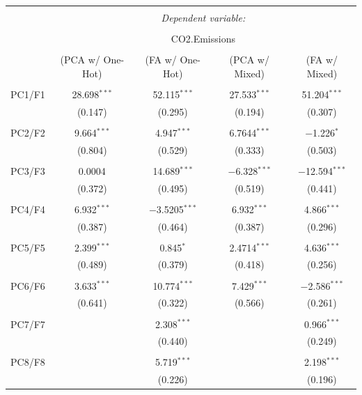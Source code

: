 \documentclass[11pt]{article}
\begin{document}
\begin{table}[!htbp] \centering \small
\begin{tabular}{@{\extracolsep{5pt}}lcccc} 
\\[-1.8ex]\hline 
\hline \\[-1.8ex] 
& \multicolumn{4}{c}{\textit{Dependent variable:}} \\ 
\cline{2-5} 
\\[-1.8ex] & \multicolumn{4}{c}{CO2.Emissions} \\ 
\\[-1.8ex] & (PCA w/ One-Hot) & (FA w/ One-Hot) & (PCA w/ Mixed) & (FA w/ Mixed)\\ 
\hline \\[-1.8ex] 
PC1/F1 & 28.698$^{***}$ & 52.115$^{***}$ & 27.533$^{***}$ &51.204$^{***}$ \\ 
& (0.147) & (0.295) & (0.194) & (0.307) \\ 
& & & & \\ 
PC2/F2 & 9.664$^{***}$ & 4.947$^{***}$ & 6.7644$^{***}$ & $-$1.226$^{*}$  \\ 
& (0.804) & (0.529) & (0.333) & (0.503) \\ 
& & & & \\ 
PC3/F3 & 0.0004 & 14.689$^{***}$ & $-$6.328$^{***}$ & $-$12.594$^{***}$ \\ 
& (0.372) & (0.495) & (0.519) & (0.441) \\ 
& & & & \\ 
PC4/F4 & 6.932$^{***}$ & $-$3.5205$^{***}$ & 6.932$^{***}$ & 4.866$^{***}$ \\ 
& (0.387) & (0.464) & (0.387) & (0.296) \\ 
& & & & \\ 
PC5/F5 & 2.399$^{***}$ & 0.845$^{*}$ & 2.4714$^{***}$ & 4.636$^{***}$\\ 
& (0.489) & (0.379) & (0.418) &  (0.256)\\ 
& & & & \\ 
PC6/F6 & 3.633$^{***}$ & 10.774$^{***}$ & 7.429$^{***}$ & $-$2.586$^{***}$\\ 
& (0.641) & (0.322) & (0.566) & (0.261) \\ 
& & & & \\ 
PC7/F7 &   & 2.308$^{***}$&  &0.966$^{***}$\\ 
&  & (0.440) &  & (0.249)\\ 
& & & & \\ 
PC8/F8 &  & 5.719$^{***}$&  &2.198$^{***}$\\ 
& & (0.226) &  & (0.196)\\ 

\end{tabular}
\end{table}
\end{document}
